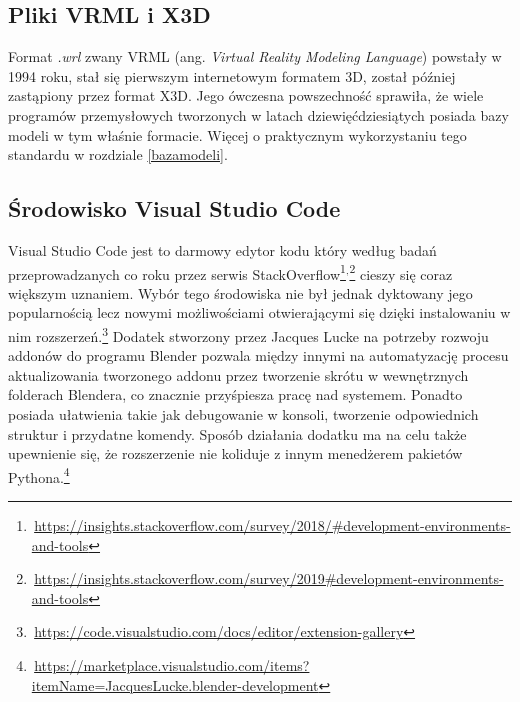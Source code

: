 \documentclass[brudnopis]{xmgr}
\begin{document}
\subsection{Pliki VRML i X3D}
Format \emph{.wrl} zwany VRML (ang. \emph {Virtual Reality Modeling Language}) powstały w 1994 roku, stał się pierwszym internetowym formatem 3D, został później zastąpiony przez format X3D.\cite{vrml} Jego ówczesna powszechność sprawiła, że wiele programów przemysłowych tworzonych w latach dziewięćdziesiątych posiada bazy modeli w tym właśnie formacie. Więcej o praktycznym wykorzystaniu tego standardu w rozdziale \ref{bazamodeli}.


\subsection{Środowisko Visual Studio Code}
Visual Studio Code jest to darmowy edytor kodu który według badań przeprowadzanych co roku przez serwis StackOverflow\footnote{\,\url{https://insights.stackoverflow.com/survey/2018/\#development-environments-and-tools}}$^{,}$\footnote{\,\url{https://insights.stackoverflow.com/survey/2019\#development-environments-and-tools}} cieszy się coraz większym uznaniem. Wybór tego środowiska nie był jednak dyktowany jego popularnością lecz nowymi możliwościami otwierającymi się dzięki instalowaniu w nim rozszerzeń.\footnote{\,\url{https://code.visualstudio.com/docs/editor/extension-gallery}} Dodatek stworzony przez Jacques Lucke na potrzeby rozwoju addonów do programu Blender pozwala między innymi na automatyzację procesu aktualizowania tworzonego addonu przez tworzenie skrótu w wewnętrznych folderach Blendera, co znacznie przyśpiesza pracę nad systemem. Ponadto posiada ułatwienia takie jak debugowanie w konsoli, tworzenie odpowiednich struktur i przydatne komendy. Sposób działania dodatku ma na celu także upewnienie się, że rozszerzenie nie koliduje z innym menedżerem pakietów Pythona.\footnote{\,\url{https://marketplace.visualstudio.com/items?itemName=JacquesLucke.blender-development}} 


\end{document}
